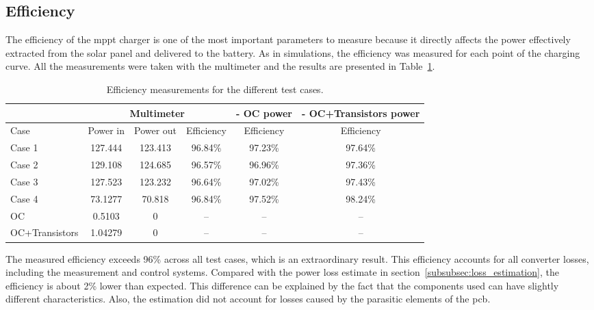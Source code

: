     \subsection{Efficiency}
        The efficiency of the \ac{mppt} charger is one of the most important parameters to measure because it directly affects the power effectively extracted from the solar panel and delivered to the battery. As in simulations, the efficiency was measured for each point of the charging curve. All the measurements were taken with the multimeter and the results are presented in Table~\ref{tab:efficiency_results}.

        \begin{table}[!ht]
            \centering
            \caption{Efficiency measurements for the different test cases.}
            \label{tab:efficiency_results}
            \begin{tabular}{|l|ccc|cc|}
                \hline
                & \multicolumn{3}{c|}{Multimeter} 
                & - OC power 
                & - OC+Transistors power \\
                \hline
                Case & Power in & Power out & Efficiency 
                & Efficiency & Efficiency \\
                \hline
                Case 1 & 127.444 & 123.413 & 96.84\% & 97.23\% & 97.64\% \\
                Case 2 & 129.108 & 124.685 & 96.57\% & 96.96\% & 97.36\% \\
                Case 3 & 127.523 & 123.232 & 96.64\% & 97.02\% & 97.43\% \\
                Case 4 & 73.1277 & 70.818 & 96.84\% & 97.52\% & 98.24\% \\
                \hline
                OC & 0.5103 & 0 & -- & -- & -- \\
                OC+Transistors & 1.04279 & 0 & -- & -- & -- \\
                \hline
            \end{tabular}
        \end{table}

        The measured efficiency exceeds 96\% across all test cases, which is an extraordinary result. This efficiency accounts for all converter losses, including the measurement and control systems. Compared with the power loss estimate in section~\ref{subsubsec:loss_estimation}, the efficiency is about 2\% lower than expected. This difference can be explained by the fact that the components used can have slightly different characteristics. Also, the estimation did not account for losses caused by the parasitic elements of the \ac{pcb}.

